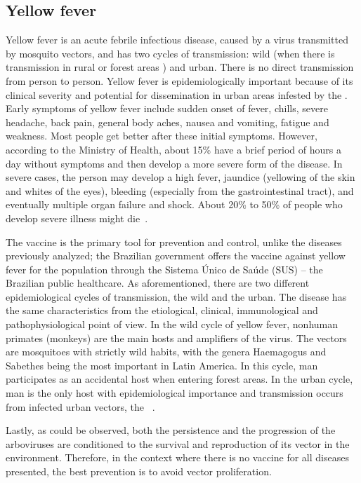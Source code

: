 \subsection{Yellow fever}
%
Yellow fever is an acute febrile infectious disease, caused by a virus transmitted by mosquito vectors, and has two cycles of transmission: wild (when there is transmission in rural or forest areas ) and urban.
There is no direct transmission from person to person.
Yellow fever is epidemiologically important because of its clinical severity and potential for dissemination in urban areas infested by the \Aedes.
Early symptoms of yellow fever include sudden onset of fever, chills, severe headache, back pain, general body aches, nausea and vomiting, fatigue and weakness. Most people get better after these initial symptoms. However, according to the Ministry of Health, about 15\% have a brief period of hours a day without symptoms and then develop a more severe form of the disease. In severe cases, the person may develop a high fever, jaundice (yellowing of the skin and whites of the eyes), bleeding (especially from the gastrointestinal tract), and eventually multiple organ failure and shock. About 20\% to 50\% of people who develop severe illness might die~\cite{web:MSyellowfever}.

The vaccine is the primary tool for prevention and control, unlike the diseases previously analyzed; the Brazilian government offers the vaccine against yellow fever for the population through the Sistema Único de Saúde (SUS) -- the Brazilian public healthcare.
As aforementioned, there are two different epidemiological cycles of transmission, the wild and the urban.
The disease has the same characteristics from the etiological, clinical, immunological and pathophysiological point of view. In the wild cycle of yellow fever, nonhuman primates (monkeys) are the main hosts and amplifiers of the virus. The vectors are mosquitoes with strictly wild habits, with the genera Haemagogus and Sabethes being the most important in Latin America. In this cycle, man participates as an accidental host when entering forest areas. In the urban cycle, man is the only host with epidemiological importance and transmission occurs from infected urban vectors, the \Aedes~\cite{camara2011dynamic}.

Lastly, as could be observed, both the persistence and the progression of the arboviruses are conditioned to the survival and reproduction of its vector in the environment. Therefore, in the context where there is no vaccine for all diseases presented, the best prevention is to avoid vector proliferation.

